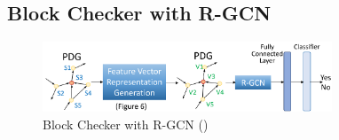


\subsection{ Block Checker with R-GCN}
\label{model:sec}

\begin{figure}[t]
	\centering
	\includegraphics[width=3.4in]{xblock.png}
	\caption{ Block Checker with R-GCN ({\xblock})}
	\label{fig:gcn}	
\end{figure}

